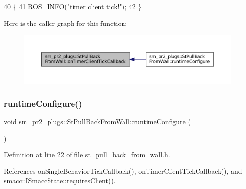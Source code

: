 \begin{DoxyCode}
40     \{
41         ROS\_INFO(\textcolor{stringliteral}{"timer client tick!"});
42     \}
\end{DoxyCode}
Here is the caller graph for this function\+:
\nopagebreak
\begin{figure}[H]
\begin{center}
\leavevmode
\includegraphics[width=350pt]{structsm__pr2__plugs_1_1StPullBackFromWall_a7872156a77c675539830c016e703c499_icgraph}
\end{center}
\end{figure}
\mbox{\label{structsm__pr2__plugs_1_1StPullBackFromWall_a1be08c0cdc17a5c038cd8549118f98a6}} 
\subsubsection{\texorpdfstring{runtime\+Configure()}{runtimeConfigure()}}
{\footnotesize\ttfamily void sm\+\_\+pr2\+\_\+plugs\+::\+St\+Pull\+Back\+From\+Wall\+::runtime\+Configure (\begin{DoxyParamCaption}{ }\end{DoxyParamCaption})\hspace{0.3cm}{\ttfamily [inline]}}



Definition at line 22 of file st\+\_\+pull\+\_\+back\+\_\+from\+\_\+wall.\+h.



References on\+Single\+Behavior\+Tick\+Callback(), on\+Timer\+Client\+Tick\+Callback(), and smacc\+::\+I\+Smacc\+State\+::requires\+Client().


